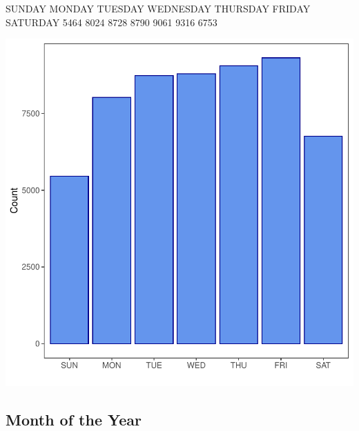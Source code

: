 \documentclass[11pt, a4paper]{article}
\begin{document}
\begin{Schunk}
\begin{Soutput}
   SUNDAY    MONDAY   TUESDAY WEDNESDAY  THURSDAY    FRIDAY  SATURDAY 
     5464      8024      8728      8790      9061      9316      6753 
\end{Soutput}
\end{Schunk}
\includegraphics{variableinvestigation-004}


\pagebreak
\subsection{Month of the Year}
\end{document}
